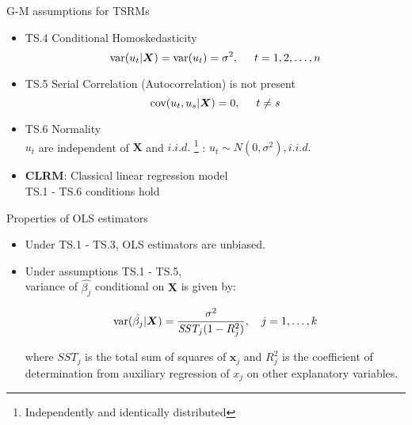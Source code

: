 \documentclass{beamer}
\begin{document}

\begin{frame}{G-M assumptions for TSRMs}
\begin{itemize}
 \item TS.4 Conditional Homoskedasticity 
 $$\textnormal{var}(u_t|\boldsymbol{X})=\textnormal{var}(u_t)=\sigma^2, \hspace{0.5cm} t=1,2,\dots,n$$
 
 \item TS.5 Serial Correlation (Autocorrelation) is not present $$ \textnormal{cov}(u_t,u_s|\boldsymbol{X}) = 0, \hspace{0.5cm} t\neq s$$

 \item TS.6 Normality \\
 $u_t$ are independent of $\boldsymbol{X}$ and $\textit{i.i.d.}$
 \footnote{Independently and identically distributed} 
 :  $u_t \sim N(0,\sigma^2), \textit{i.i.d.} $
 
 \vspace{0.6cm}
 
 \item \textbf{CLRM}: Classical linear regression model \\
 TS.1 - TS.6 conditions hold
 
\end{itemize}
\end{frame}


\begin{frame}{Properties of OLS estimators}
\begin{itemize}
\item Under TS.1 - TS.3, OLS estimators are unbiased.
\vspace{0.5cm}
\item Under assumptions TS.1 - TS.5, \\ 
variance of $\hat{\beta_j}$ conditional on $\boldsymbol{X}$ is given by: 

$$\textnormal{var}(\hat{\beta_j}|\boldsymbol{X}) 
  =\frac{\sigma^2}{\textit{SST}_j(1-R^2_j)}, \quad j=1,\dots,k$$

where $\textit{SST}_j$ is the total sum of squares of $\boldsymbol{x}_{j}$ and $R^2_j$ is the coefficient of determination from auxiliary regression of $x_j$ on other explanatory variables. 
\end{itemize}
\end{frame}
\end{document}
